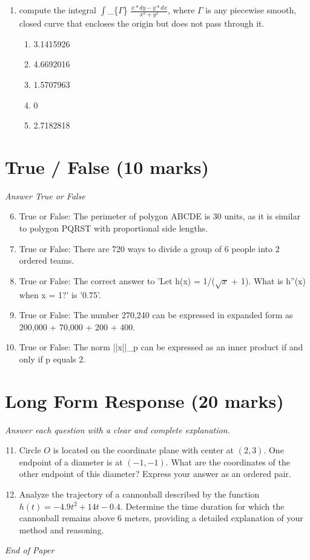 \documentclass[12pt]{article}
\begin{document}
\begin{enumerate}[label=\arabic*.]
\begin{enumerate}[label=(\alph*)]
    \item 25
    \item 22
    \item 30
    \item 27
    \item 29
\end{enumerate}
\item compute the integral \ensuremath{\int}\_\{\ensuremath{\Gamma}\} \ensuremath{\frac{x*dy-y*dx}{x^2+y^2}}, where $\Gamma$ is any piecewise smooth, closed curve that encloses the origin but does not pass through it.
\begin{enumerate}[label=(\alph*)]
    \item 3.1415926
    \item 4.6692016
    \item 1.5707963
    \item 0
    \item 2.7182818
\end{enumerate}
\end{enumerate}

\section*{True / False (10 marks)}
\textit{Answer True or False}
\begin{enumerate}[label=\arabic*.]
\setcounter{enumi}{5}
\item True or False: The perimeter of polygon ABCDE is 30 units, as it is similar to polygon PQRST with proportional side lengths.
\item True or False: There are 720 ways to divide a group of 6 people into 2 ordered teams.
\item True or False: The correct answer to 'Let h(x) = 1/(\ensuremath{\sqrt{x}} + 1). What is h''(x) when x = 1?' is '0.75'.
\item True or False: The number 270,240 can be expressed in expanded form as 200,000 + 70,000 + 200 + 400.
\item True or False: The norm ||x||\_p can be expressed as an inner product if and only if p equals 2.
\end{enumerate}

\section*{Long Form Response (20 marks)}
\textit{Answer each question with a clear and complete explanation.}
\begin{enumerate}[label=\arabic*.]
\setcounter{enumi}{10}
\item Circle $O$ is located on the coordinate plane with center at $(2,3)$. One endpoint of a diameter is at $(-1,-1)$. What are the coordinates of the other endpoint of this diameter? Express your answer as an ordered pair.
\item Analyze the trajectory of a cannonball described by the function \( h(t) = -4.9 t^2 + 14 t - 0.4 \). Determine the time duration for which the cannonball remains above 6 meters, providing a detailed explanation of your method and reasoning.
\end{enumerate}

\vfill
\noindent\textit{End of Paper}
\end{document}
